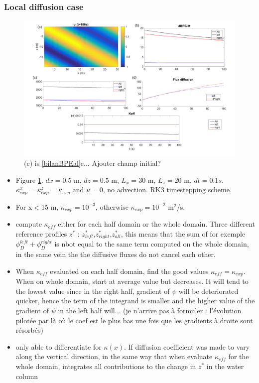 \subsubsection{Local diffusion case}

\begin{figure}[h!]
\centering
\includegraphics[width=1\textwidth]{./CHAP_BPE/AGBPE_numlab2.png}
\caption{(c) is \ref{bilanBPEal}e... Ajouter champ initial?}
\label{fig2numlab}
\end{figure}

\begin{itemize}
\item Figure \ref{fig2numlab}. $dx=0.5$ m, $dz=0.5$ m, $L_x=30$ m, $L_z=20$ m, $dt=0.1s$. $\kappa_{exp}^x=\kappa_{exp}^z=\kappa_{exp}$ and $u=0$, no advection. RK3 timestepping scheme.
\item For x$<$15 m, $\kappa_{exp} = 10^{-3}$, otherwise $\kappa_{exp} = 10^{-2}$ m$^2$/s.
\item compute $\kappa_{eff}$ either for each half domain or the whole domain. Three different reference profiles $z^*$ : $z^*_{left}$,$z^*_{right}$,$z^*_{all}$, this means that the sum of for exemple $\phi_D^{left}+\phi_D^{right}$ is nbot equal to the same term computed on the whole domain, in the same vein the the diffusive fluxes do not cancel each other.
\item When $\kappa_{eff}$ evaluated on each half domain, find the good values $\kappa_{eff}=\kappa_{exp}$. When on whole domain, start at average value but decreases. It will tend to the lowest value since in the right half, gradient of $\psi$ will be deteriorated quicker, hence the term of the integrand is smaller and the higher value of the gradient of $\psi$ in the left half will... (je n'arrive pas à formuler : l'évolution pilotée par là où le coef est le plus bas une fois que les gradients à droite sont résorbés)
\item only able to differentiate for $\kappa(x)$. If diffusion coefficient was made to vary along the vertical direction, in the same way that when evaluate $\kappa_{eff}$ for the whole domain, integrates all contributions to the change in $z^*$ in the water column
\end{itemize}

